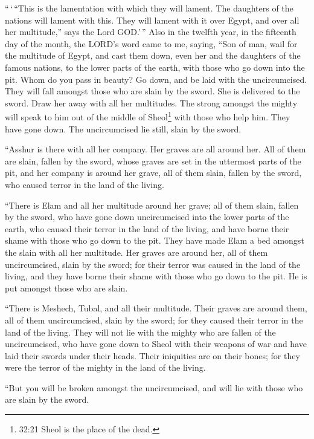  ``\,`\,``This is the lamentation with which they will
lament. The daughters of the nations will lament with this. They will
lament with it over Egypt, and over all her multitude,'' says the Lord
GOD.'\,''  Also in the twelfth year, in the fifteenth day
of the month, the LORD's word came to me, saying,  ``Son of
man, wail for the multitude of Egypt, and cast them down, even her and
the daughters of the famous nations, to the lower parts of the earth,
with those who go down into the pit.  Whom do you pass in
beauty? Go down, and be laid with the uncircumcised.  They
will fall amongst those who are slain by the sword. She is delivered to
the sword. Draw her away with all her multitudes.  The
strong amongst the mighty will speak to him out of the middle of
Sheol\footnote{32:21 Sheol is the place of the dead.} with those who
help him. They have gone down. The uncircumcised lie still, slain by the
sword.

 ``Asshur is there with all her company. Her graves are all
around her. All of them are slain, fallen by the sword, 
whose graves are set in the uttermost parts of the pit, and her company
is around her grave, all of them slain, fallen by the sword, who caused
terror in the land of the living.

 ``There is Elam and all her multitude around her grave;
all of them slain, fallen by the sword, who have gone down uncircumcised
into the lower parts of the earth, who caused their terror in the land
of the living, and have borne their shame with those who go down to the
pit.  They have made Elam a bed amongst the slain with all
her multitude. Her graves are around her, all of them uncircumcised,
slain by the sword; for their terror was caused in the land of the
living, and they have borne their shame with those who go down to the
pit. He is put amongst those who are slain.

 ``There is Meshech, Tubal, and all their multitude. Their
graves are around them, all of them uncircumcised, slain by the sword;
for they caused their terror in the land of the living. 
They will not lie with the mighty who are fallen of the uncircumcised,
who have gone down to Sheol with their weapons of war and have laid
their swords under their heads. Their iniquities are on their bones; for
they were the terror of the mighty in the land of the living.

 ``But you will be broken amongst the uncircumcised, and
will lie with those who are slain by the sword.

